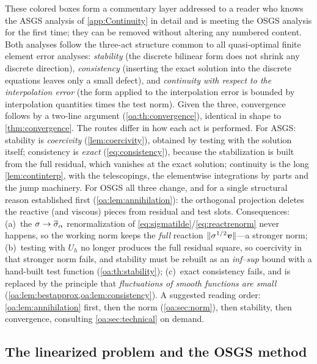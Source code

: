 \begin{pedagogy}
These colored boxes form a commentary layer addressed to a reader who knows the
ASGS analysis of \cref{app:Continuity} in detail and is meeting the OSGS analysis
for the first time; they can be removed without altering any numbered content.
Both analyses follow the three-act structure common to all quasi-optimal finite
element error analyses: \emph{stability} (the discrete bilinear form does not
shrink any discrete direction), \emph{consistency} (inserting the exact solution
into the discrete equations leaves only a small defect), and \emph{continuity
with respect to the interpolation error} (the form applied to the interpolation
error is bounded by interpolation quantities times the test norm). Given the
three, convergence follows by a two-line argument (\cref{oa:th:convergence}),
identical in shape to \cref{thm:convergence}. The routes differ in how each act
is performed. For ASGS: stability is \emph{coercivity} (\cref{lem:coercivity}),
obtained by testing with the solution itself; consistency is \emph{exact}
(\cref{eq:consistency}), because the stabilization is built from the full
residual, which vanishes at the exact solution; continuity is the long
\cref{lem:continterp}, with the telescopings, the elementwise integrations by
parts and the jump machinery. For OSGS all three change, and for a single
structural reason established first (\cref{oa:lem:annihilation}): the
orthogonal projection deletes the reactive (and viscous) pieces from residual
and test slots. Consequences: (a)~the $\sigma \to \widetilde{\sigma}_{\alpha}$ renormalization
of \cref{eq:sigmatilde}/\cref{eq:reactrenorm} never happens, so the working norm
keeps the \emph{full} reaction $\lVert \sigma^{1/2}\boldsymbol{v} \rVert$---a stronger norm;
(b)~testing with $U_h$ no longer produces the full residual square, so
coercivity in that stronger norm fails, and stability must be rebuilt as an
\emph{inf--sup} bound with a hand-built test function (\cref{oa:th:stability});
(c)~exact consistency fails, and is replaced by the principle that
\emph{fluctuations of smooth functions are small}
(\cref{oa:lem:bestapprox,oa:lem:consistency}). A suggested reading order:
\cref{oa:lem:annihilation} first, then the norm (\cref{oa:sec:norm}), then
stability, then convergence, consulting \cref{oa:sec:technical} on demand.
\end{pedagogy}

\subsection{The linearized problem and the OSGS method}
\label{oa:sec:setting}


